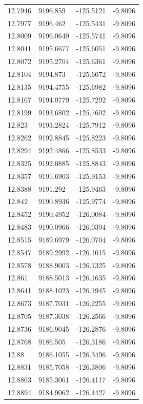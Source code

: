 \begin{table}[H]
\begin{tabular}{llll}
12.7946 & 9196.859 & -125.5121 & -9.8096 \\
12.7977 & 9196.462 & -125.5431 & -9.8096 \\
12.8009 & 9196.0649 & -125.5741 & -9.8096 \\
12.8041 & 9195.6677 & -125.6051 & -9.8096 \\
12.8072 & 9195.2704 & -125.6361 & -9.8096 \\
12.8104 & 9194.873 & -125.6672 & -9.8096 \\
12.8135 & 9194.4755 & -125.6982 & -9.8096 \\
12.8167 & 9194.0779 & -125.7292 & -9.8096 \\
12.8199 & 9193.6802 & -125.7602 & -9.8096 \\
12.823 & 9193.2824 & -125.7912 & -9.8096 \\
12.8262 & 9192.8845 & -125.8223 & -9.8096 \\
12.8294 & 9192.4866 & -125.8533 & -9.8096 \\
12.8325 & 9192.0885 & -125.8843 & -9.8096 \\
12.8357 & 9191.6903 & -125.9153 & -9.8096 \\
12.8388 & 9191.292 & -125.9463 & -9.8096 \\
12.842 & 9190.8936 & -125.9774 & -9.8096 \\
12.8452 & 9190.4952 & -126.0084 & -9.8096 \\
12.8483 & 9190.0966 & -126.0394 & -9.8096 \\
12.8515 & 9189.6979 & -126.0704 & -9.8096 \\
12.8547 & 9189.2992 & -126.1015 & -9.8096 \\
12.8578 & 9188.9003 & -126.1325 & -9.8096 \\
12.861 & 9188.5013 & -126.1635 & -9.8096 \\
12.8641 & 9188.1023 & -126.1945 & -9.8096 \\
12.8673 & 9187.7031 & -126.2255 & -9.8096 \\
12.8705 & 9187.3038 & -126.2566 & -9.8096 \\
12.8736 & 9186.9045 & -126.2876 & -9.8096 \\
12.8768 & 9186.505 & -126.3186 & -9.8096 \\
12.88 & 9186.1055 & -126.3496 & -9.8096 \\
12.8831 & 9185.7058 & -126.3806 & -9.8096 \\
12.8863 & 9185.3061 & -126.4117 & -9.8096 \\
12.8894 & 9184.9062 & -126.4427 & -9.8096 \\

\end{tabular}
\end{table}
